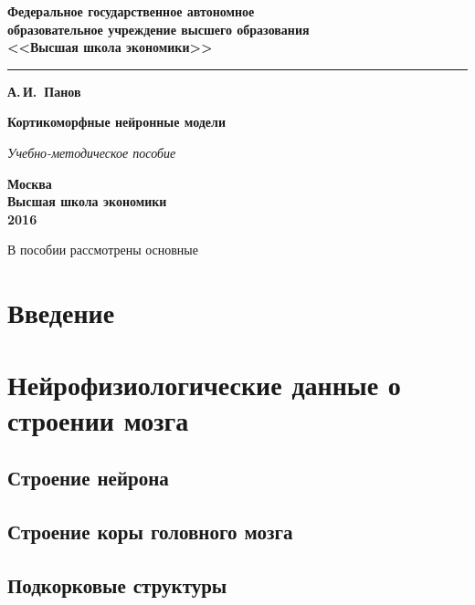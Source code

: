 \documentclass[11pt]{memoir}
\begin{document}
	\pagestyle{empty}
		\begin{center}
			{\bfseries  Федеральное государственное автономное \\
				образовательное учреждение высшего образования\\
				<<Высшая школа экономики>>
				
			}

			\vspace{-5pt}
			\noindent\rule{\textwidth}{2pt}
			
			\vspace{50pt}
			{\Large\bfseries А.\,И.~Панов}
			
			\vspace{100pt}
			{\Huge\bfseries Кортикоморфные нейронные модели}
			
			\vspace{20pt}
			{\Large\itshape Учебно-методическое пособие}
			
			\vfill
			{\bfseries Москва\\
				Высшая школа экономики\\
				2016
			}
		\end{center}

	
	\frontmatter
	
	В пособии рассмотрены основные 
	
	\clearpage
	\tableofcontents %
		
	\mainmatter
	
	\chapter*{Введение}
		

	\chapter{Нейрофизиологические данные о строении мозга}
	
	\section{Строение нейрона}

	\section{Строение коры головного мозга}
	\section{Подкорковые структуры}
	
\end{document}
